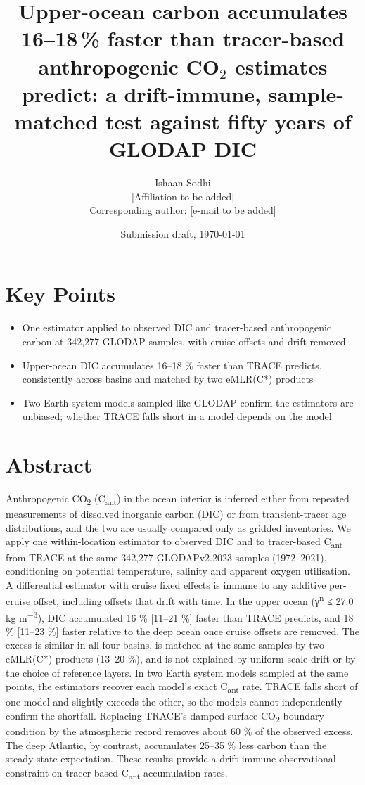 \documentclass[11pt]{article}
\title{Upper-ocean carbon accumulates 16--18\,\% faster than tracer-based anthropogenic CO$_2$ estimates predict: a drift-immune, sample-matched test against fifty years of GLODAP DIC}
\author{Ishaan Sodhi\\[2pt]\small [Affiliation to be added]\\\small Corresponding author: [e-mail to be added]}
\date{Submission draft, \today}
\providecommand{\tightlist}{\setlength{\itemsep}{0pt}\setlength{\parskip}{0pt}}
\begin{document}
\maketitle

\section*{Key Points}\label{key-points}

\begin{itemize}
\tightlist
\item
  One estimator applied to observed DIC and tracer-based anthropogenic
  carbon at 342,277 GLODAP samples, with cruise offsets and drift
  removed
\item
  Upper-ocean DIC accumulates 16--18 \% faster than TRACE predicts,
  consistently across basins and matched by two eMLR(C*) products
\item
  Two Earth system models sampled like GLODAP confirm the estimators are
  unbiased; whether TRACE falls short in a model depends on the model
\end{itemize}

\section*{Abstract}\label{abstract}

Anthropogenic CO\textsubscript{2} (C\textsubscript{ant}) in the ocean
interior is inferred either from repeated measurements of dissolved
inorganic carbon (DIC) or from transient-tracer age distributions, and
the two are usually compared only as gridded inventories. We apply one
within-location estimator to observed DIC and to tracer-based
C\textsubscript{ant} from TRACE at the same 342,277 GLODAPv2.2023
samples (1972--2021), conditioning on potential temperature, salinity
and apparent oxygen utilisation. A differential estimator with cruise
fixed effects is immune to any additive per-cruise offset, including
offsets that drift with time. In the upper ocean (γ\textsuperscript{n} ≤
27.0 kg m\textsuperscript{−3}), DIC accumulated 16 \% {[}11--21 \%{]}
faster than TRACE predicts, and 18 \% {[}11--23 \%{]} faster relative to
the deep ocean once cruise offsets are removed. The excess is similar in
all four basins, is matched at the same samples by two eMLR(C*) products
(13--20 \%), and is not explained by uniform scale drift or by the
choice of reference layers. In two Earth system models sampled at the
same points, the estimators recover each model's exact
C\textsubscript{ant} rate. TRACE falls short of one model and slightly
exceeds the other, so the models cannot independently confirm the
shortfall. Replacing TRACE's damped surface CO\textsubscript{2} boundary
condition by the atmospheric record removes about 60 \% of the observed
excess. The deep Atlantic, by contrast, accumulates 25--35 \% less
carbon than the steady-state expectation. These results provide a
drift-immune observational constraint on tracer-based
C\textsubscript{ant} accumulation rates.
\end{document}
